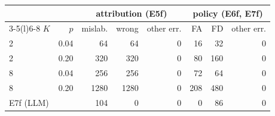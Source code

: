 \begin{tabular}{@{}lrrrrrrr@{}}
\toprule
 & & \multicolumn{3}{c}{attribution (E5f)} & \multicolumn{3}{c}{policy (E6f, E7f)} \\
\cmidrule(lr){3-5}\cmidrule(l){6-8}
$K$ & $p$ & mislab. & wrong & other err. & FA & FD & other err. \\
\midrule
2 & 0.04 & 64 & 64 & 0 & 16 & 32 & 0 \\
2 & 0.20 & 320 & 320 & 0 & 80 & 160 & 0 \\
8 & 0.04 & 256 & 256 & 0 & 72 & 64 & 0 \\
8 & 0.20 & 1280 & 1280 & 0 & 208 & 480 & 0 \\
\midrule
\multicolumn{2}{l}{E7f (LLM)} & 104 & 0 & 0 & 0 & 86 & 0 \\
\bottomrule
\end{tabular}
